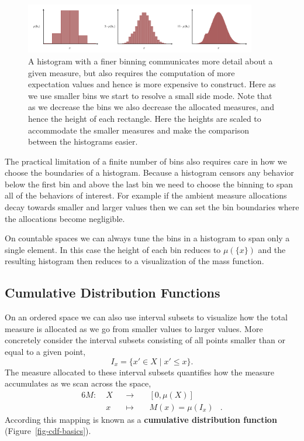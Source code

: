\documentclass[
  letterpaper,
  DIV=11,
  numbers=noendperiod]{scrartcl}
\begin{document}
\begin{figure}

{\centering \includegraphics[width=0.9\textwidth,height=\textheight]{figures/histograms/varying_binning/varying_binning.pdf}

}

\caption{\label{fig-hist-binning}A histogram with a finer binning
communicates more detail about a given measure, but also requires the
computation of more expectation values and hence is more expensive to
construct. Here as we use smaller bins we start to resolve a small side
mode. Note that as we decrease the bins we also decrease the allocated
measures, and hence the height of each rectangle. Here the heights are
scaled to accommodate the smaller measures and make the comparison
between the histograms easier.}

\end{figure}

The practical limitation of a finite number of bins also requires care
in how we choose the boundaries of a histogram. Because a histogram
censors any behavior below the first bin and above the last bin we need
to choose the binning to span all of the behaviors of interest. For
example if the ambient measure allocations decay towards smaller and
larger values then we can set the bin boundaries where the allocations
become negligible.

On countable spaces we can always tune the bins in a histogram to span
only a single element. In this case the height of each bin reduces to
\(\mu( \{ x \} )\) and the resulting histogram then reduces to a
visualization of the mass function.

\hypertarget{cumulative-distribution-functions}{%
\subsection{Cumulative Distribution
Functions}\label{cumulative-distribution-functions}}

On an ordered space we can also use interval subsets to visualize how
the total measure is allocated as we go from smaller values to larger
values. More concretely consider the interval subsets consisting of all
points smaller than or equal to a given point, \[
I_{x} = \{ x' \in X \mid x' \le x \}.
\] The measure allocated to these interval subsets quantifies how the
measure accumulates as we scan across the space, \begin{alignat*}{6}
M :\; & X & &\rightarrow& \; &[0, \mu(X)]&
\\
& x & &\mapsto& & M(x) = \mu(I_{x}) &.
\end{alignat*} According this mapping is known as a \textbf{cumulative
distribution function} (Figure~\ref{fig-cdf-basics}).
\end{document}
